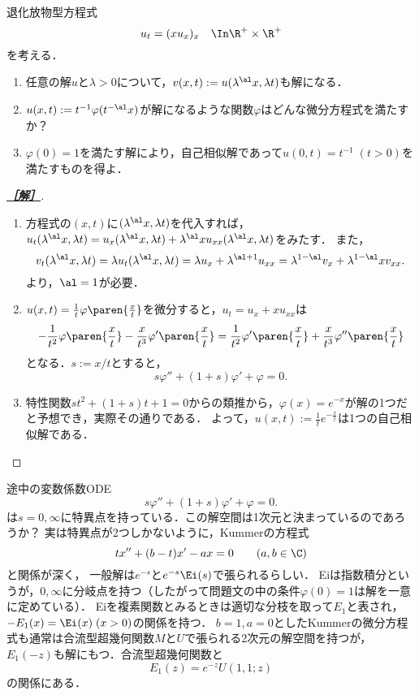 \documentclass[uplatex,dvipdfmx]{jsarticle}
\begin{document}
\begin{problem}
    退化放物型方程式
    \[u_t=(xu_x)_x\quad\In\R^+\times\R^+\]
    を考える．
    \begin{enumerate}
        \item 任意の解$u$と$\lambda>0$について，$v(x,t):=u(\lambda^\al x,\lambda t)$も解になる．
        \item $u(x,t):=t^{-1}\varphi(t^{-\al}x)$が解になるような関数$\varphi$はどんな微分方程式を満たすか？
        \item $\varphi(0)=1$を満たす解により，自己相似解であって$u(0,t)=t^{-1}\;(t>0)$を満たすものを得よ．
    \end{enumerate}
\end{problem}
\begin{proof}[\bf\underline{［解］}]\mbox{}
    \begin{enumerate}
        \item 方程式の$(x,t)$に$(\lambda^\al x,\lambda t)$を代入すれば，$u_t(\lambda^\al x,\lambda t)=u_x(\lambda^\al x,\lambda t)+\lambda^\al xu_{xx}(\lambda^\al x,\lambda t)$をみたす．
        また，\[v_t(\lambda^\al x,\lambda t)=\lambda u_t(\lambda^\al x,\lambda t)=\lambda u_x+\lambda^{\al+1}u_{xx}=\lambda^{1-\al}v_x+\lambda^{1-\al}xv_{xx}.\]
        より，$\al=1$が必要．
        \item $u(x,t)=\frac{1}{t}\varphi\paren{\frac{x}{t}}$を微分すると，$u_t=u_x+xu_{xx}$は
        \[-\frac{1}{t^2}\varphi\paren{\frac{x}{t}}-\frac{x}{t^3}\varphi'\paren{\frac{x}{t}}=\frac{1}{t^2}\varphi'\paren{\frac{x}{t}}+\frac{x}{t^3}\varphi''\paren{\frac{x}{t}}\]
        となる．$s:=x/t$とすると，
        \[s\varphi''+(1+s)\varphi'+\varphi=0.\]
        \item 特性関数$st^2+(1+s)t+1=0$からの類推から，$\varphi(x)=e^{-x}$が解の1つだと予想でき，実際その通りである．
        よって，$u(x,t):=\frac{1}{t}e^{-\frac{x}{t}}$は1つの自己相似解である．
    \end{enumerate}
\end{proof}
\begin{remark*}[途中で出現したKummerの微分方程式について]
    途中の変数係数ODE
    \[s\varphi''+(1+s)\varphi'+\varphi=0.\]
    は$s=0,\infty$に特異点を持っている．この解空間は1次元と決まっているのであろうか？
    実は特異点が2つしかないように，Kummerの方程式
    \[tx''+(b-t)x'-ax=0\qquad(a,b\in\C)\]
    と関係が深く，
    一般解は$e^{-s}$と$e^{-s}\Ei(s)$で張られるらしい．
    Eiは指数積分というが，$0,\infty$に分岐点を持つ（したがって問題文の中の条件$\varphi(0)=1$は解を一意に定めている）．
    Eiを複素関数とみるときは適切な分枝を取って$E_1$と表され，$-E_1(x)=\Ei(x)\;(x>0)$の関係を持つ．
    $b=1,a=0$としたKummerの微分方程式も通常は合流型超幾何関数$M$と$U$で張られる2次元の解空間を持つが，
    $E_1(-z)$も解にもつ．合流型超幾何関数と
    \[E_1(z)=e^{-z}U(1,1;z)\]
    の関係にある．
\end{remark*}
\end{document}
